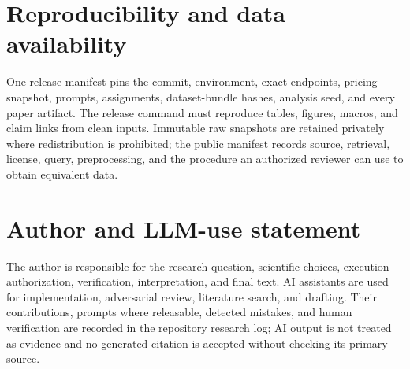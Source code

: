 \documentclass[11pt]{article}
\begin{document}
\section{Reproducibility and data availability}
One release manifest pins the commit, environment, exact endpoints, pricing
snapshot, prompts, assignments, dataset-bundle hashes, analysis seed, and every
paper artifact. The release command must reproduce tables, figures, macros, and
claim links from clean inputs. Immutable raw snapshots are retained privately
where redistribution is prohibited; the public manifest records source,
retrieval, license, query, preprocessing, and the procedure an authorized
reviewer can use to obtain equivalent data.

\section{Author and LLM-use statement}
The author is responsible for the research question, scientific choices,
execution authorization, verification, interpretation, and final text. AI
assistants are used for implementation, adversarial review, literature search,
and drafting. Their contributions, prompts where releasable, detected mistakes,
and human verification are recorded in the repository research log; AI output
is not treated as evidence and no generated citation is accepted without
checking its primary source.



\end{document}
